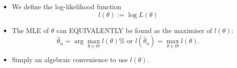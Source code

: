 \documentclass[notes=show]{beamer}
\begin{document}
\begin{frame}%


\begin{itemize}
\item We define the log-likelihood function%
\begin{equation*}
l\left( \theta \right) :=\log L\left( \theta \right)
\end{equation*}

\item The MLE of $\theta $ can EQUIVALENTLY be found as the maximiser of $%
l\left( \theta \right) :$%
\begin{equation*}
\hat{\theta}_{n}=\arg \max_{\theta \in \Theta }l\left( \theta \right) \text{%
\ \ \ or\ \ \ }l\left( \hat{\theta}_{n}\right) =\max_{\theta \in \Theta
}l\left( \theta \right) .
\end{equation*}

\item Simply an algebraic convenience to use $l\left( \theta \right) $.
\end{itemize}

\end{frame}%
\end{document}
